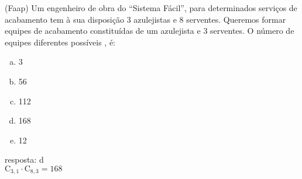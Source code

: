 \begin{ex}
 	(Faap) Um engenheiro de obra do “Sistema Fácil”, para determinados serviços de acabamento tem à sua disposição 3 azulejistas e 8 serventes. Queremos formar equipes de acabamento constituídas de um azulejista e 3 serventes. O número de equipes diferentes possíveis , é:
    \begin{enumerate}[(a)]
    \item 3
    \item 56
    \item 112
    \item 168
    \item 12
    \end{enumerate}
     \begin{sol}
       resposta: d \\
       $\mathrm{C}_{3,1}\cdot\mathrm{C}_{8,3}=168$
     \end{sol}
\end{ex}